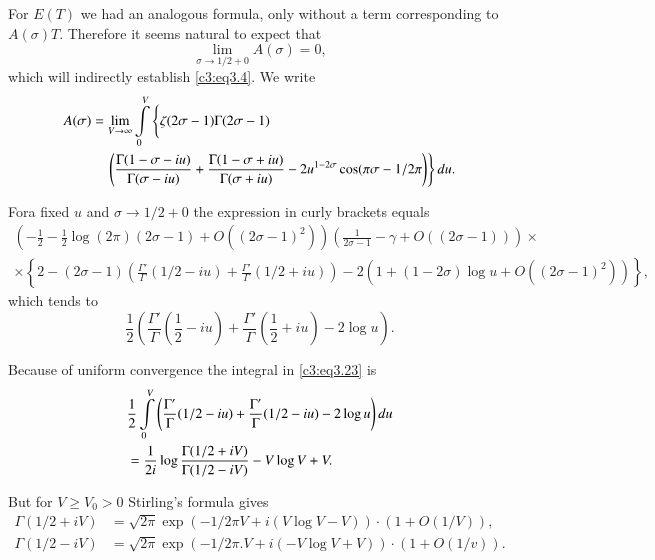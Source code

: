 For $E(T)$ we had an analogous formula, only without a term
corresponding to $A(\sigma)T$. Therefore it seems natural to expect
that 
\begin{equation}
  \lim\limits_{\sigma \to 1/2 + 0} A(\sigma )=0,\label{c3:eq3.22}
\end{equation}
which will indirectly establish \eqref{c3:eq3.4}. We write
\begin{align}
  A(\sigma)  &= \lim\limits_{V \to \infty} \int\limits_0^V 
   \left\{ \zeta (2 \sigma -1) \Gamma (2 \sigma-1)\vphantom{\frac{\Gamma}{\Gamma}}\right.\label{c3:eq3.23}\\ 
   &\quad \left.\left(\frac{\Gamma
    (1- \sigma - iu)}{\Gamma (\sigma - iu)} + \frac{\Gamma (1- \sigma
    + iu)}{\Gamma (\sigma + iu)} - 2u^{1-2 \sigma} \cos (\pi \sigma -
  1/2 \pi \right)\right\} du.\notag
\end{align}

For\pageoriginale a fixed $u$ and $\sigma \to 1/2 +0$ the expression in curly brackets
equals 
{\fontsize{8}{10}\selectfont
\begin{multline*}
  \left(- \frac{1}{2} - \frac{1}{2} \log (2 \pi) (2 \sigma -1) + O ((2
  \sigma-1)^2)\right) \left(\frac{1}{2 \sigma-1} - \gamma + O((2
  \sigma -1)) \right)\times\\
  \times \left\{2- (2\sigma-1) \left(\frac{\Gamma'}{\Gamma} (1/2 -iu)
  + \frac{\Gamma'}{\Gamma} (1/2 + iu) \right)- 2(1+ (1-2\sigma)\log u
  + O ((2 \sigma -1)^2)) \right\},
\end{multline*}}
which tends to 
$$
\frac{1}{2} \left( \frac{\Gamma'}{\Gamma} \left(\frac{1}{2} - iu
\right) + \frac{\Gamma'}{\Gamma} \left(\frac{1}{2} + iu \right)- 2\log
u\right). 
$$

Because of uniform convergence the integral in \eqref{c3:eq3.23} is 
\begin{align}
  & \frac{1}{2} \int\limits_0^V \left(\frac{\Gamma'}{\Gamma} (1/2 -
  iu) + \frac{\Gamma'}{\Gamma}(1/2 - iu) - 2 \log u
  \right)du\label{c3:eq3.24}\\ 
  & = \frac{1}{2i} \log \frac{\Gamma (1/2+ iV)}{\Gamma (1/2- iV)} -
  V\log V + V.\notag
\end{align}

But for $V \geq V_0 > 0$ Stirling's formula gives
\begin{align*}
  \Gamma (1/2 + iV) & = \sqrt{2 \pi} \exp (- 1/2 \pi V + i (V \log V-V))
  \cdot (1+ O(1/V)),\\
  \Gamma (1/2 - iV)& = \sqrt{2 \pi} \exp (- 1/2 \pi .V + i (-V \log V
  + V))\cdot (1+ O(1/v)).
\end{align*}

